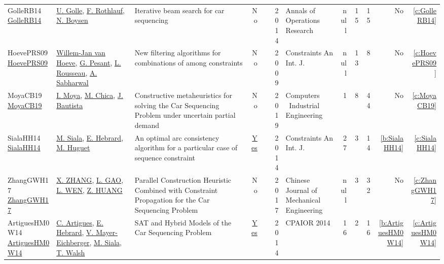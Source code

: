 {\begin{longtable}{>{\raggedright\arraybackslash}p{3cm}>{\raggedright\arraybackslash}p{6cm}>{\raggedright\arraybackslash}p{6.5cm}rrrp{2.5cm}rrrrr}
GolleRB14 \href{http://dx.doi.org/10.1007/s10479-014-1733-0}{GolleRB14} & \hyperref[auth:a61]{U. Golle}, \hyperref[auth:a62]{F. Rothlauf}, \hyperref[auth:a48]{N. Boysen} & Iterative beam search for car sequencing & No & \cite{GolleRB14} & 2014 & Annals of Operations Research & null & 15 & 15 & No & \ref{c:GolleRB14}\\
HoevePRS09 \href{http://dx.doi.org/10.1007/s10601-008-9067-7}{HoevePRS09} & \hyperref[auth:a39]{Willem-Jan van Hoeve}, \hyperref[auth:a40]{G. Pesant}, \hyperref[auth:a41]{L. Rousseau}, \hyperref[auth:a42]{A. Sabharwal} & New filtering algorithms for combinations of among constraints & No & \cite{HoevePRS09} & 2009 & Constraints An Int. J. & null & 13 & 8 & No & \ref{c:HoevePRS09}\\
MoyaCB19 \href{http://dx.doi.org/10.1016/j.cie.2019.106048}{MoyaCB19} & \hyperref[auth:a63]{I. Moya}, \hyperref[auth:a64]{M. Chica}, \hyperref[auth:a65]{J. Bautista} & Constructive metaheuristics for solving the Car Sequencing Problem under uncertain partial demand & No & \cite{MoyaCB19} & 2019 & Computers \  Industrial Engineering & 1 & 8 & 44 & No & \ref{c:MoyaCB19}\\
SialaHH14 \href{https://doi.org/10.1007/s10601-013-9150-6}{SialaHH14} & \hyperref[auth:a11]{M. Siala}, \hyperref[auth:a12]{E. Hebrard}, \hyperref[auth:a13]{M. Huguet} & An optimal arc consistency algorithm for a particular case of sequence constraint & \href{cars/works/SialaHH14.pdf}{Yes} & \cite{SialaHH14} & 2014 & Constraints An Int. J. & 27 & 3 & 14 & \ref{b:SialaHH14} & \ref{c:SialaHH14}\\
ZhangGWH17 \href{http://dx.doi.org/10.1007/s10033-017-0083-7}{ZhangGWH17} & \hyperref[auth:a51]{X. ZHANG}, \hyperref[auth:a52]{L. GAO}, \hyperref[auth:a53]{L. WEN}, \hyperref[auth:a54]{Z. HUANG} & Parallel Construction Heuristic Combined with Constraint Propagation for the Car Sequencing Problem & No & \cite{ZhangGWH17} & 2017 & Chinese Journal of Mechanical Engineering & null & 3 & 32 & No & \ref{c:ZhangGWH17}\\
ArtiguesHM0W14 \href{https://doi.org/10.1007/978-3-319-07046-9\_19}{ArtiguesHM0W14} & \hyperref[auth:a8]{C. Artigues}, \hyperref[auth:a12]{E. Hebrard}, \hyperref[auth:a35]{V. Mayer{-}Eichberger}, \hyperref[auth:a11]{M. Siala}, \hyperref[auth:a36]{T. Walsh} & {SAT} and Hybrid Models of the Car Sequencing Problem & \href{cars/works/ArtiguesHM0W14.pdf}{Yes} & \cite{ArtiguesHM0W14} & 2014 & CPAIOR 2014 & 16 & 2 & 16 & \ref{b:ArtiguesHM0W14} & \ref{c:ArtiguesHM0W14}\\

\end{longtable}}
